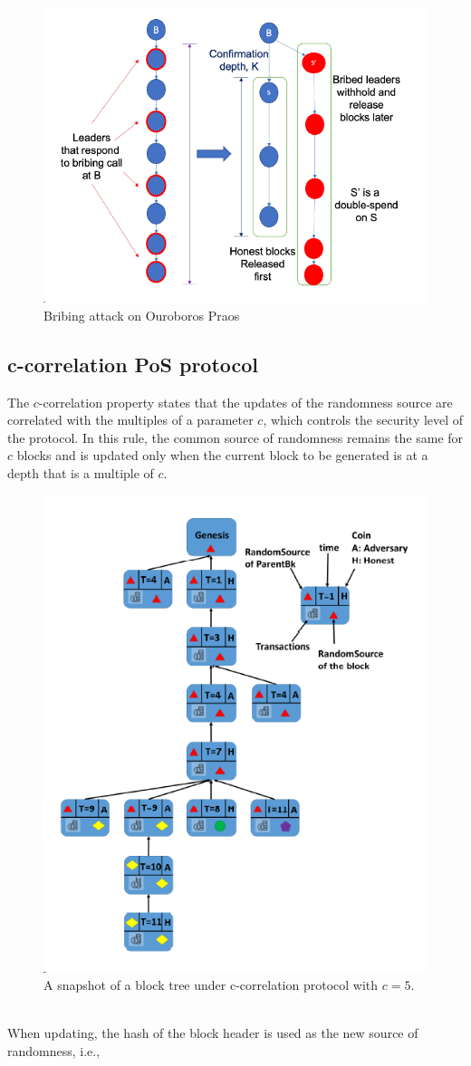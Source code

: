 \begin{figure}[h!]
    \centering
    \includegraphics[width=0.55\linewidth]{Fig/11/F4}
    \caption{Bribing attack on Ouroboros Praos}
    \label{fig:f4}
\end{figure}

\subsection{c-correlation PoS protocol}
The $c$-correlation property states that the updates of the randomness source are correlated with the multiples of a parameter $c$, which controls the security level of the protocol. In this rule, the common source of randomness remains the same for $c$ blocks and is updated only when the current block to be generated is at a depth that is a multiple of $c$.
\begin{figure}[h!]
    \centering
    \includegraphics[width=0.5\linewidth]{Fig/11/F5}
    \caption{A snapshot of a block tree under c-correlation protocol with $c = 5$.}
    \label{fig:f5}
\end{figure}\\
When updating, the hash of the block header is used as the new source of randomness, i.e.,
